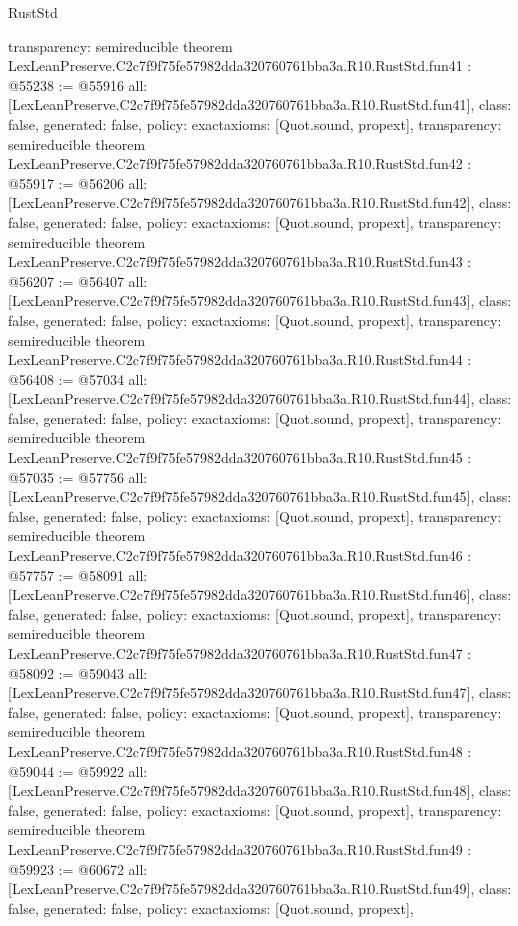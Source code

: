 \begin{lexlean}{RustStd}
\begin{coremodule}
{  transparency: semireducible
}
theorem LexLeanPreserve.C2c7f9f75fe57982dda320760761bba3a.R10.RustStd.fun41 : @55238 := @55916 {
  all: [LexLeanPreserve.C2c7f9f75fe57982dda320760761bba3a.R10.RustStd.fun41],
  class: false,
  generated: false,
  policy: exact{axioms: [Quot.sound, propext]},
  transparency: semireducible
}
theorem LexLeanPreserve.C2c7f9f75fe57982dda320760761bba3a.R10.RustStd.fun42 : @55917 := @56206 {
  all: [LexLeanPreserve.C2c7f9f75fe57982dda320760761bba3a.R10.RustStd.fun42],
  class: false,
  generated: false,
  policy: exact{axioms: [Quot.sound, propext]},
  transparency: semireducible
}
theorem LexLeanPreserve.C2c7f9f75fe57982dda320760761bba3a.R10.RustStd.fun43 : @56207 := @56407 {
  all: [LexLeanPreserve.C2c7f9f75fe57982dda320760761bba3a.R10.RustStd.fun43],
  class: false,
  generated: false,
  policy: exact{axioms: [Quot.sound, propext]},
  transparency: semireducible
}
theorem LexLeanPreserve.C2c7f9f75fe57982dda320760761bba3a.R10.RustStd.fun44 : @56408 := @57034 {
  all: [LexLeanPreserve.C2c7f9f75fe57982dda320760761bba3a.R10.RustStd.fun44],
  class: false,
  generated: false,
  policy: exact{axioms: [Quot.sound, propext]},
  transparency: semireducible
}
theorem LexLeanPreserve.C2c7f9f75fe57982dda320760761bba3a.R10.RustStd.fun45 : @57035 := @57756 {
  all: [LexLeanPreserve.C2c7f9f75fe57982dda320760761bba3a.R10.RustStd.fun45],
  class: false,
  generated: false,
  policy: exact{axioms: [Quot.sound, propext]},
  transparency: semireducible
}
theorem LexLeanPreserve.C2c7f9f75fe57982dda320760761bba3a.R10.RustStd.fun46 : @57757 := @58091 {
  all: [LexLeanPreserve.C2c7f9f75fe57982dda320760761bba3a.R10.RustStd.fun46],
  class: false,
  generated: false,
  policy: exact{axioms: [Quot.sound, propext]},
  transparency: semireducible
}
theorem LexLeanPreserve.C2c7f9f75fe57982dda320760761bba3a.R10.RustStd.fun47 : @58092 := @59043 {
  all: [LexLeanPreserve.C2c7f9f75fe57982dda320760761bba3a.R10.RustStd.fun47],
  class: false,
  generated: false,
  policy: exact{axioms: [Quot.sound, propext]},
  transparency: semireducible
}
theorem LexLeanPreserve.C2c7f9f75fe57982dda320760761bba3a.R10.RustStd.fun48 : @59044 := @59922 {
  all: [LexLeanPreserve.C2c7f9f75fe57982dda320760761bba3a.R10.RustStd.fun48],
  class: false,
  generated: false,
  policy: exact{axioms: [Quot.sound, propext]},
  transparency: semireducible
}
theorem LexLeanPreserve.C2c7f9f75fe57982dda320760761bba3a.R10.RustStd.fun49 : @59923 := @60672 {
  all: [LexLeanPreserve.C2c7f9f75fe57982dda320760761bba3a.R10.RustStd.fun49],
  class: false,
  generated: false,
  policy: exact{axioms: [Quot.sound, propext]},
}
\end{coremodule}
\end{lexlean}
